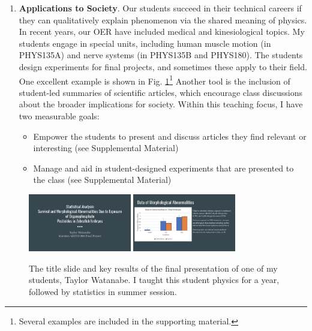\documentclass[../../../main.tex]{subfiles}
\begin{document}
\begin{enumerate}
\item \textbf{Applications to Society}. Our students succeed in their technical careers if they can qualitatively explain phenomenon via the shared meaning of physics.  In recent years, our OER \cite{openstax1} \cite{openstax2} have included medical and kinesiological topics.  My students engage in special units, including human muscle motion (in PHYS135A) and nerve systems (in PHYS135B and PHYS180).  The students design experiments for final projects, and sometimes these apply to their field.  One excellent example is shown in Fig. \ref{fig:taylor_1}\footnote{Several examples are included in the supporting material.} Another tool is the inclusion of student-led summaries of scientific articles, which encourage class discussions about the broader implications for society.  Within this teaching focus, I have two measurable goals:

\begin{itemize}
\item Empower the students to present and discuss articles they find relevant or interesting (see Supplemental Material)
\item Manage and aid in student-designed experiments that are presented to the class (see Supplemental Material)
\end{itemize}

\end{enumerate}

\begin{figure}
\centering
\includegraphics[width=0.4\textwidth]{figures/taylor1.png}
\includegraphics[width=0.4\textwidth]{figures/taylor2.png}
\caption{\label{fig:taylor_1} The title slide and key results of the final presentation of one of my students, Taylor Watanabe.  I taught this student physics for a year, followed by statistics in summer session.}
\end{figure}
\end{document}
